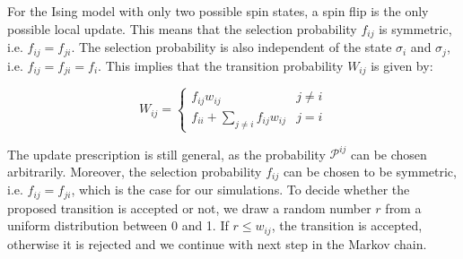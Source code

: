 For the Ising model with only two possible spin states, a spin flip is the only
possible local update. This means that the selection probability \( f_{ij} \) is
symmetric, i.e. \( f_{ij} = f_{ji} \). The selection probability is also
independent of the state \( \sigma_i \) and \( \sigma_j \), i.e. \( f_{ij} =
f_{ji} = f_{i} \). This implies that the transition probability \( W_{ij} \) is
given by:

\begin{equation}
    W_{ij} =
    \begin{cases}
        f_{ij} w_{ij} & j \neq i \\
        f_{ii} + \sum_{j \neq i} f_{ij} w_{ij} & j = i
    \end{cases}
\end{equation}

The update prescription is still general, as the probability \( \mathcal{P}^{ij}
\) can be chosen arbitrarily. Moreover, the selection probability \( f_{ij} \)
can be chosen to be symmetric, i.e. \( f_{ij} = f_{ji} \), which is the case for
our simulations. To decide whether the proposed transition is accepted or not,
we draw a random number \( r \) from a uniform distribution between 0 and 1. If
\( r \leq w_{ij} \), the transition is accepted, otherwise it is rejected and we
continue with next step in the Markov chain.
